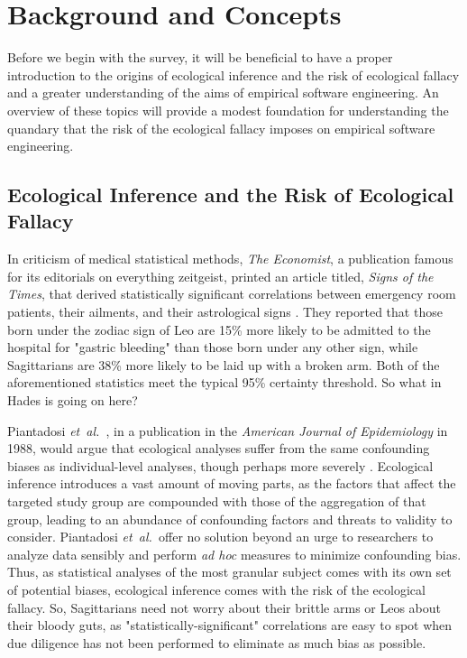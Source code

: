 \documentclass{sig-alternate-05-2015}
\newcommand{\etal}{\mbox{\emph{et al.\ }}}
\begin{document}
\section{Background and Concepts}

Before we begin with the survey, it will be beneficial to have a proper introduction to the origins of ecological inference and the risk of ecological fallacy and a greater understanding of the aims of empirical software engineering.  An overview of these topics will provide a modest foundation for understanding the quandary that the risk of the ecological fallacy imposes on empirical software engineering.

\subsection{Ecological Inference and the Risk of Ecological Fallacy}
In criticism of medical statistical methods, \emph{The Economist}, a publication famous for its editorials on everything zeitgeist, printed an article titled, \emph{Signs of the Times}, that derived statistically significant correlations between emergency room patients, their ailments, and their astrological signs \cite{Economist:2007}.  They reported that those born under the zodiac sign of Leo are 15\% more likely to be admitted to the hospital for "gastric bleeding" than those born under any other sign, while Sagittarians are 38\% more likely to be laid up with a broken arm.  Both of the aforementioned statistics meet the typical 95\% certainty threshold.  So what in Hades is going on here?

Piantadosi \etal, in a publication in the \emph{American Journal of Epidemiology} in 1988, would argue that ecological analyses suffer from the same confounding biases as individual-level analyses, though perhaps more severely \cite{Piantadosi:1988}.  Ecological inference introduces a vast amount of moving parts, as the factors that affect the targeted study group are compounded with those of the aggregation of that group, leading to an abundance of confounding factors and threats to validity to consider. Piantadosi \etal offer no solution beyond an urge to researchers to analyze data sensibly and perform \emph{ad hoc} measures to minimize confounding bias.  Thus, as statistical analyses of the most granular subject comes with its own set of potential biases, ecological inference comes with the risk of the ecological fallacy.  So, Sagittarians need not worry about their brittle arms or Leos about their bloody guts, as "statistically-significant" correlations are easy to spot when due diligence has not been performed to eliminate as much bias as possible.
\end{document}
